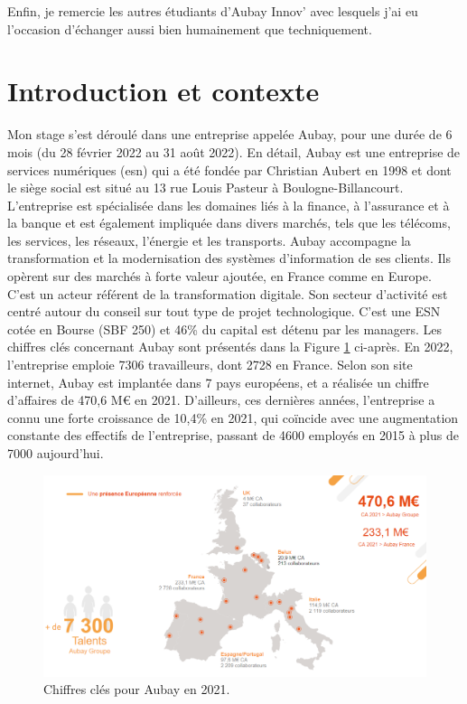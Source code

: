 \documentclass[11pt]{article}
\begin{document}
    Enfin, je remercie les autres étudiants d’Aubay Innov' avec lesquels j'ai eu l'occasion d'échanger aussi bien humainement que techniquement.

  \pagebreak

  \section{Introduction et contexte}    
  
  Mon stage s'est déroulé dans une entreprise appelée Aubay, pour une durée de 6 mois (du 28 février 2022 au 31 août 2022). 
  En détail, Aubay est une entreprise de services numériques (\acrshort{esn}) qui a été fondée par Christian Aubert en 1998 et 
  dont le siège social est situé au 13 rue Louis Pasteur à Boulogne-Billancourt. L'entreprise est spécialisée dans les domaines 
  liés à la finance, à l'assurance et à la banque et est également impliquée dans divers marchés, tels que les télécoms, 
  les services, les réseaux, l'énergie et les transports. Aubay accompagne la transformation et la modernisation des systèmes 
  d’information de ses clients. Ils opèrent sur des marchés à forte valeur ajoutée, en France comme en Europe. C'est un acteur 
  référent de la transformation digitale. Son secteur d'activité est centré autour du conseil sur tout type de projet technologique.  
  C'est une ESN cotée en Bourse (SBF 250) et 46\% du capital est détenu par les managers. Les chiffres clés concernant Aubay 
  sont présentés dans la Figure \ref{fig:PA1} ci-après. En 2022, l'entreprise emploie 7306 travailleurs, dont 2728 en France. 
  Selon son site internet, Aubay est implantée dans 7 pays européens, et a réalisée un chiffre d'affaires de 470,6 M€ en 2021. 
  D'ailleurs, ces dernières années, l'entreprise a connu une forte croissance de 10,4\% en 2021, qui coïncide avec une augmentation 
  constante des effectifs de l'entreprise, passant de 4600 employés en 2015 à plus de 7000 aujourd'hui.
 
  \begin{figure}[hbt]  
    \includegraphics[width=\textwidth]{PresentationAubay1.png}    
    \caption{Chiffres clés pour Aubay en 2021.}
    \label{fig:PA1}
  \end{figure}    
  
\end{document}
